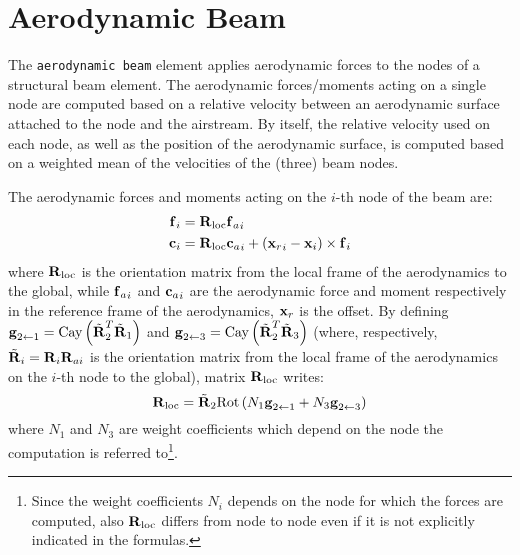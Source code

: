 \section{Aerodynamic Beam}

The \texttt{aerodynamic beam} element applies aerodynamic forces
to the nodes of a structural beam element. 
The aerodynamic forces/moments acting on a single node 
are computed based on a relative 
velocity between an aerodynamic surface attached 
to the node and the airstream. By itself, the relative velocity 
used on each node, as well as the position of the aerodynamic 
surface, is computed based on a weighted mean of the velocities
of the (three) beam nodes. 

\newcommand{\Rloc}{{\TT{R}_{\text{loc}}}}
\newcommand{\Rtilde}[1]{\tilde{\TT{R}}_{#1}}
\newcommand{\Cay}[1]{\text{Cay}\plbr{#1}}
\newcommand{\Rot}[1]{\text{Rot}\plbr{#1}}
The aerodynamic forces and moments acting on the $i$-th node of the
beam are:
\begin{subequations}\label{eq:fici}
\begin{align}
	\T{f}_i &= \Rloc {\T{f}_a}_i\\ 
	\T{c}_i &= \Rloc {\T{c}_a}_i 
		+ \plbr{{\T{x}_r}_i - \T{x}_i}\times{\T{f}}_i 
\end{align}
\end{subequations}
where $\Rloc$ is the orientation 
matrix from the local frame of the aerodynamics
to the global, while ${\bm{\mathbf{f}}_a}_i$ and ${\bm{\mathbf{c}}_a}_i$ are the 
aerodynamic force and moment 
respectively in the reference frame of the aerodynamics, $\bm{\mathbf{x}}_r$
is the offset. 
By defining $\T{g}_{2\leftarrow{1}} = \Cay{\Rtilde{2}^T\Rtilde{1}}$ 
and $\T{g}_{2\leftarrow{3}} = \Cay{\Rtilde{2}^T\Rtilde{3}}$ (where, respectively,
$\Rtilde{i} = \TT{R}_i\TT{R}_{ai}$ is the orientation matrix from the 
local frame of the aerodynamics on the $i$-th node to the global),
matrix $\Rloc$ writes:
\begin{equation}
	\Rloc = \Rtilde{2} \Rot{N_1\T{g}_{2\leftarrow{1}} + N_3\T{g}_{2\leftarrow{3}}}
\end{equation}
where $N_1$ and $N_3$ are weight coefficients which depend on
the node the computation is referred to\footnote{Since the 
weight coefficients $N_i$ depends on the node for which the
forces are computed, also $\Rloc$ differs from node to node
even if it is not explicitly indicated in the formulas. }.

